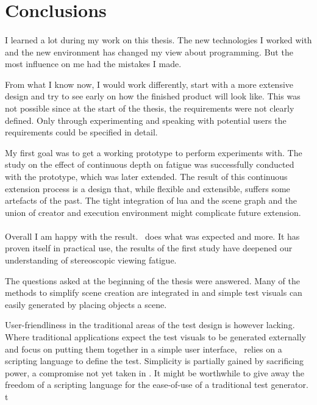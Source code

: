 \section{Conclusions}
\paragraph{}
I learned a lot during my work on this thesis.
The new technologies I worked with and the new environment has changed my view about programming.
But the most influence on me had the mistakes I made.

From what I know now, I would work differently, start with a more extensive design and try to see early on how the finished product will look like.
This was not possible since at the start of the thesis, the requirements were not clearly defined.
Only through experimenting and speaking with potential users the requirements could be specified in detail.

My first goal was to get a working prototype to perform experiments with.
The study on the effect of continuous depth on fatigue was successfully conducted with the prototype, which was later extended.
The result of this continuous extension process is a design that, while flexible and extensible, suffers some artefacts of the past.
The tight integration of lua and the scene graph and the union of creator and execution environment might complicate future extension.

\paragraph{}
Overall I am happy with the result.
\ER\ does what was expected and more.
It has proven itself in practical use, the results of the first study have deepened our understanding of stereoscopic viewing fatigue.

The questions asked at the beginning of the thesis were answered.
Many of the methods to simplify scene creation are integrated in \ER and
simple test visuals can easily generated by placing objects a scene.

User-friendliness in the traditional areas of the test design is however lacking.
Where traditional applications expect the test visuals to be generated externally and focus on putting them together in a simple user interface, \ER\ relies on a scripting language to define the test.
Simplicity is partially gained by sacrificing power, a compromise not yet taken in \ER.
It might be worthwhile to give away the freedom of a scripting language for the ease-of-use of a traditional test generator.
t

